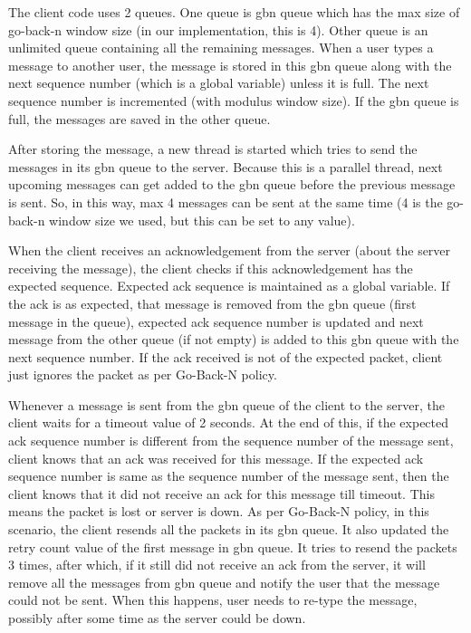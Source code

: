 \documentclass[10pt, pdftex, twocolumn]{report}
\begin{document}
	The client code uses 2 queues. One queue is gbn queue which has the max size of go-back-n window size (in our implementation, this is 4). Other queue is an unlimited queue containing all the remaining messages. When a user types a message to another user, the message is stored in this gbn queue along with the next sequence number (which is a global variable) unless it is full. The next sequence number is incremented (with modulus window size). If the gbn queue is full, the messages are saved in the other queue.
	
	After storing the message, a new thread is started which tries to send the messages in its gbn queue to the server. Because this is a parallel thread, next upcoming messages can get added to the gbn queue before the previous message is sent. So, in this way, max 4 messages can be sent at the same time (4 is the go-back-n window size we used, but this can be set to any value). 
	
	When the client receives an acknowledgement from the server (about the server receiving the message), the client checks if this acknowledgement has the expected sequence. Expected ack sequence is maintained as a global variable. If the ack is as expected, that message is removed from the gbn queue (first message in the queue), expected ack sequence number is updated and next message from the other queue (if not empty) is added to this gbn queue with the next sequence number. If the ack received is not of the expected packet, client just ignores the packet as per Go-Back-N policy. 
	
	Whenever a message is sent from the gbn queue of the client to the server, the client waits for a timeout value of 2 seconds. At the end of this, if the expected ack sequence number is different from the sequence number of the message sent, client knows that an ack was received for this message. If the expected ack sequence number is same as the sequence number of the message sent, then the client knows that it did not receive an ack for this message till timeout. This means the packet is lost or server is down. As per Go-Back-N policy, in this scenario, the client resends all the packets in its gbn queue. It also updated the retry count value of the first message in gbn queue. It tries to resend the packets 3 times, after which, if it still did not receive an ack from the server, it will remove all the messages from gbn queue and notify the user that the message could not be sent. When this happens, user needs to re-type the message, possibly after some time as the server could be down.
	
\end{document}
